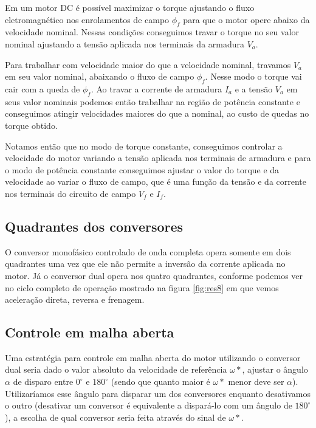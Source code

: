 \documentclass{article}
\begin{document}
Em um motor DC é possível maximizar o torque ajustando o fluxo eletromagnético nos enrolamentos de campo $\phi_f$ para que o motor opere abaixo da velocidade nominal. Nessas condições conseguimos travar o torque no seu valor nominal ajustando a tensão aplicada nos terminais da armadura $V_a$.

Para trabalhar com velocidade maior do que a velocidade nominal, travamos $V_a$ em seu valor nominal, abaixando o fluxo de campo $\phi_f$. Nesse modo o torque vai cair com a queda de $\phi_f$. Ao travar a corrente de armadura $I_a$ e a tensão $V_a$ em seus valor nominais podemos então trabalhar na região de potência constante e conseguimos atingir velocidades maiores do que a nominal, ao custo de quedas no torque obtido.

Notamos então que no modo de torque constante, conseguimos controlar a velocidade do motor variando a tensão aplicada nos terminais de armadura e para o modo de potência constante conseguimos ajustar o valor do torque e da velocidade ao variar o fluxo de campo, que é uma função da tensão e da corrente nos terminais do circuito de campo $V_f$ e $I_f$.

\subsection{Quadrantes dos conversores}
O conversor monofásico controlado de onda completa opera somente em dois quadrantes uma vez que ele não permite a inversão da corrente aplicada no motor. Já o conversor dual opera nos quatro quadrantes, conforme podemos ver no ciclo completo de operação mostrado na figura \ref{fig:res8} em que vemos aceleração direta, reversa e frenagem.

\subsection{Controle em malha aberta}
Uma estratégia para controle em malha aberta do motor utilizando o conversor dual seria dado o valor absoluto da velocidade de referência $\omega*$, ajustar o ângulo $\alpha$ de disparo entre $0^\circ$ e $180^\circ$ (sendo que quanto maior é $\omega*$ menor deve ser $\alpha$). Utilizaríamos esse ângulo para disparar um dos conversores enquanto desativamos o outro (desativar um conversor é equivalente a dispará-lo com um ângulo de $180^\circ$), a escolha de qual conversor seria feita através do sinal de $\omega*$.

\end{document}
